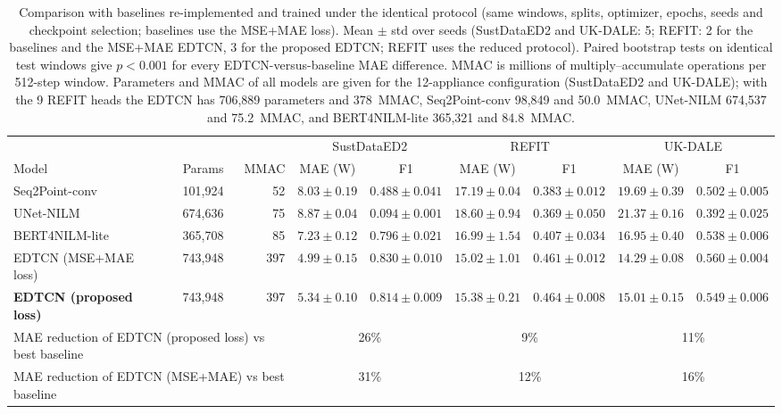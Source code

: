 \documentclass[fleqn,10pt]{wlscirep}
\begin{document}
\begin{table}[!t]
\centering
\caption{Comparison with baselines re-implemented and trained under the identical protocol (same windows, splits, optimizer, epochs, seeds and checkpoint selection; baselines use the MSE+MAE loss). Mean $\pm$ std over seeds (SustDataED2 and UK-DALE: 5; REFIT: 2 for the baselines and the MSE+MAE EDTCN, 3 for the proposed EDTCN; REFIT uses the reduced protocol). Paired bootstrap tests on identical test windows give $p<0.001$ for every EDTCN-versus-baseline MAE difference. MMAC is millions of multiply--accumulate operations per 512-step window. Parameters and MMAC of all models are given for the 12-appliance configuration (SustDataED2 and UK-DALE); with the 9 REFIT heads the EDTCN has 706,889 parameters and 378~MMAC, Seq2Point-conv 98,849 and 50.0~MMAC, UNet-NILM 674,537 and 75.2~MMAC, and BERT4NILM-lite 365,321 and 84.8~MMAC.}
\label{tab:baselines}
\footnotesize
\begin{adjustbox}{max width=\textwidth}\begin{tabular}{@{}lrr cc cc cc@{}}
\toprule
 & & & \multicolumn{2}{c}{SustDataED2} & \multicolumn{2}{c}{REFIT} & \multicolumn{2}{c}{UK-DALE} \\
\cmidrule(lr){4-5}\cmidrule(lr){6-7}\cmidrule(lr){8-9}
Model & Params & MMAC & MAE (W) & F1 & MAE (W) & F1 & MAE (W) & F1 \\
\midrule
Seq2Point-conv & 101{,}924 & 52 & $8.03\pm0.19$ & $0.488\pm0.041$ & $17.19\pm0.04$ & $0.383\pm0.012$ & $19.69\pm0.39$ & $0.502\pm0.005$ \\
UNet-NILM & 674{,}636 & 75 & $8.87\pm0.04$ & $0.094\pm0.001$ & $18.60\pm0.94$ & $0.369\pm0.050$ & $21.37\pm0.16$ & $0.392\pm0.025$ \\
BERT4NILM-lite & 365{,}708 & 85 & $7.23\pm0.12$ & $0.796\pm0.021$ & $16.99\pm1.54$ & $0.407\pm0.034$ & $16.95\pm0.40$ & $0.538\pm0.006$ \\
\midrule
EDTCN (MSE+MAE loss) & 743{,}948 & 397 & $4.99\pm0.15$ & $0.830\pm0.010$ & $15.02\pm1.01$ & $0.461\pm0.012$ & $14.29\pm0.08$ & $0.560\pm0.004$ \\
\textbf{EDTCN (proposed loss)} & 743{,}948 & 397 & $5.34\pm0.10$ & $0.814\pm0.009$ & $15.38\pm0.21$ & $0.464\pm0.008$ & $15.01\pm0.15$ & $0.549\pm0.006$ \\
\midrule
\multicolumn{3}{l}{MAE reduction of EDTCN (proposed loss) vs best baseline} & \multicolumn{2}{c}{26\%} & \multicolumn{2}{c}{9\%} & \multicolumn{2}{c}{11\%} \\
\multicolumn{3}{l}{MAE reduction of EDTCN (MSE+MAE) vs best baseline} & \multicolumn{2}{c}{31\%} & \multicolumn{2}{c}{12\%} & \multicolumn{2}{c}{16\%} \\
\bottomrule
\end{tabular}\end{adjustbox}
\end{table}
\end{document}
